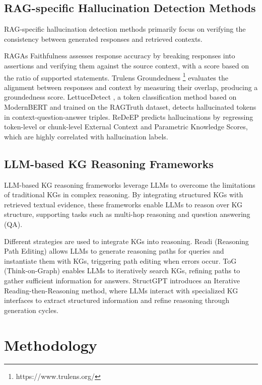 \documentclass[11pt]{article}
\begin{document}
\subsection{RAG-specific Hallucination Detection Methods}
RAG-specific hallucination detection methods primarily focus on verifying the consistency between generated responses and retrieved contexts. 

RAGAs Faithfulness \cite{es2024ragas} assesses response accuracy by breaking responses into assertions and verifying them against the source context, with a score based on the ratio of supported statements. Trulens Groundedness \footnote{https://www.trulens.org/} evaluates the alignment between responses and context by measuring their overlap, producing a groundedness score. LettuceDetect \cite{kovacs2025lettucedetect}, a token classification method based on ModernBERT and trained on the RAGTruth \cite{wu2024ragtruth} dataset, detects hallucinated tokens in context-question-answer triples. ReDeEP \cite{sun2025redeep} predicts hallucinations by regressing token-level or chunk-level External Context and Parametric Knowledge Scores, which are highly correlated with hallucination labels.

\subsection{LLM-based KG Reasoning Frameworks}\label{framework}

LLM-based KG reasoning frameworks leverage LLMs to overcome the limitations of traditional KGs in complex reasoning. By integrating structured KGs with retrieved textual evidence, these frameworks enable LLMs to reason over KG structure, supporting tasks such as multi-hop reasoning and question answering (QA).

Different strategies are used to integrate KGs into reasoning. Readi (Reasoning Path Editing) \cite{cheng2024call} allows LLMs to generate reasoning paths for queries and instantiate them with KGs, triggering path editing when errors occur. ToG (Think-on-Graph) \cite{sun2023think} enables LLMs to iteratively search KGs, refining paths to gather sufficient information for answers. StructGPT \cite{jiang2023structgpt} introduces an Iterative Reading-then-Reasoning method, where LLMs interact with specialized KG interfaces to extract structured information and refine reasoning through generation cycles.


\section{Methodology}\label{Methodology}
\end{document}
